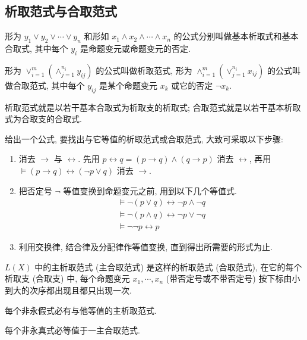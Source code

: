 \documentclass[
    color=black,
    device=normal,
    lang=cn
]{elegantnote}
\begin{document}
\subsection{析取范式与合取范式}
\begin{definition}[基本析取式与基本合取式]
    形为 $y_1\lor y_2\lor \cdots\lor y_n$ 和形如 $x_1\land x_2\land \cdots\land x_n$ 的公式分别叫做基本析取式和基本合取式, 其中每个 $y_i$ 是命题变元或命题变元的否定.
\end{definition}
\begin{definition}[析取范式与合取范式]
    形为 $\lor_{i=1}^m\left(\land_{j=1}^{n_i} y_{ij}\right)$ 的公式叫做析取范式, 形为 $\land_{i=1}^m\left(\lor_{j=1}^{n_i} x_{ij}\right)$ 的公式叫做合取范式, 其中每个 $y_{ij}$ 是某个命题变元 $x_k$ 或它的否定 $\lnot x_k$.
\end{definition}
析取范式就是以若干基本合取式为析取支的析取式; 合取范式就是以若干基本析取式为合取支的合取式.

给出一个公式, 要找出与它等值的析取范式或合取范式, 大致可采取以下步骤:
\begin{enumerate}[label = $\arabic*^\circ$, topsep = -1em, listparindent = 2em]
    \item 消去 $\to$ 与 $\leftrightarrow$. 先用 $p\leftrightarrow q = (p\to q)\land (q\to p)$ 消去 $\leftrightarrow$, 再用 $\vDash (p\to q)\leftrightarrow (\lnot p\lor q)$ 消去 $\to$.
    \item 把否定号 $\lnot$ 等值变换到命题变元之前, 用到以下几个等值式.
          \begin{gather*}
              \vDash \lnot (p\lor q) \leftrightarrow \lnot p\land \lnot q\\
              \vDash \lnot (p\land q) \leftrightarrow \lnot p\lor \lnot q\\
              \vDash \lnot\lnot p \leftrightarrow p
          \end{gather*}
    \item 利用交换律, 结合律及分配律作等值变换, 直到得出所需要的形式为止.
\end{enumerate}
\begin{definition}[主析取范式与主合取范式]
    $L(X)$ 中的主析取范式 (主合取范式) 是这样的析取范式 (合取范式), 在它的每个析取支 (合取支) 中, 每个命题变元 $x_1, \cdots,x_n$ (带否定号或不带否定号) 按下标由小到大的次序都出现且都只出现一次.
\end{definition}
\begin{theorem}
    每个非永假式必有与他等值的主析取范式.
\end{theorem}
\begin{theorem}
    每个非永真式必等值于一主合取范式.
\end{theorem}
\end{document}
